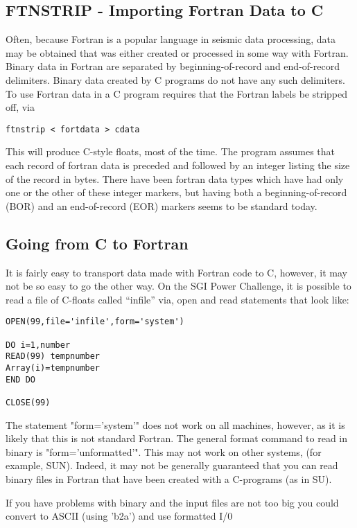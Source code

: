 {{{\subsection{FTNSTRIP - Importing Fortran Data to C}
Often, because Fortran is a popular language in seismic data processing,
data may be obtained that was either created or processed in some
way with Fortran.
Binary data in Fortran are separated by beginning-of-record
and end-of-record delimiters. Binary data created by C programs do not have
any such delimiters.
To use Fortran data in a C program requires that the Fortran labels
be stripped off, via
{\small\begin{verbatim}
ftnstrip < fortdata > cdata
\end{verbatim}}\noindent
This will produce C-style floats, most of the time.
The program assumes that each record of fortran data is preceded
and followed by an integer listing the size of the record in bytes.
There have been fortran data types which have had only one or the
other of these integer markers, but having both a beginning-of-record
(BOR) and an end-of-record (EOR) markers seems to be standard today.

\subsection{Going from C to Fortran}

It is fairly easy to transport data made with Fortran code to C, however,
it may not be so easy to go the other way. On
the SGI Power Challenge, it is possible to read a file of C-floats
called ``infile'' via, open and read statements that look like:

{\small\begin{verbatim}
OPEN(99,file='infile',form='system') 

DO i=1,number
READ(99) tempnumber
Array(i)=tempnumber
END DO

CLOSE(99)
\end{verbatim}}\noindent

The statement "form='system'" does not work on all machines, however,
as it is likely that this is not standard Fortran.  The general format
command to read in binary is "form='unformatted'".  This may not work
on other systems, (for example, SUN). Indeed, it may not be generally
guaranteed that you can
read binary files in Fortran that have been created with a C-programs
(as in SU).

If you have problems with binary and the input files are not too
big you could convert to ASCII (using 'b2a') and use formatted I/0

}}}
